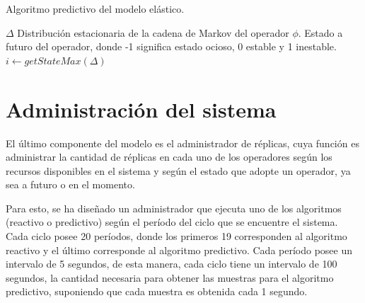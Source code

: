 \begin{algorithm}[!ht]
	\caption{Algoritmo predictivo del modelo elástico.}
	\label{alg:predictive}
	\begin{algorithmic}[1]
	\REQUIRE$\Delta$ Distribución estacionaria de la cadena de Markov del operador $\phi$.
	\ENSURE Estado a futuro del operador, donde -1 significa estado ocioso, 0 estable y 1 inestable.
		\STATE $i \leftarrow getStateMax(\Delta)$ 
		\ELSE
		\ENDIF
	\ENDIF
	
	
	\end{algorithmic}
\end{algorithm}

\section{Administración del sistema}

El último componente del modelo es el administrador de réplicas, cuya función es administrar la cantidad de réplicas en cada uno de los operadores según los recursos disponibles en el sistema y según el estado que adopte un operador, ya sea a futuro o en el momento.

Para esto, se ha diseñado un administrador que ejecuta uno de los algoritmos (reactivo o predictivo) según el período del ciclo que se encuentre el sistema. Cada ciclo posee 20 períodos, donde los primeros 19 corresponden al algoritmo reactivo y el último corresponde al algoritmo predictivo. Cada período posee un intervalo de 5 segundos, de esta manera, cada ciclo tiene un intervalo de 100 segundos, la cantidad necesaria para obtener las muestras para el algoritmo predictivo, suponiendo que cada muestra es obtenida cada 1 segundo.

